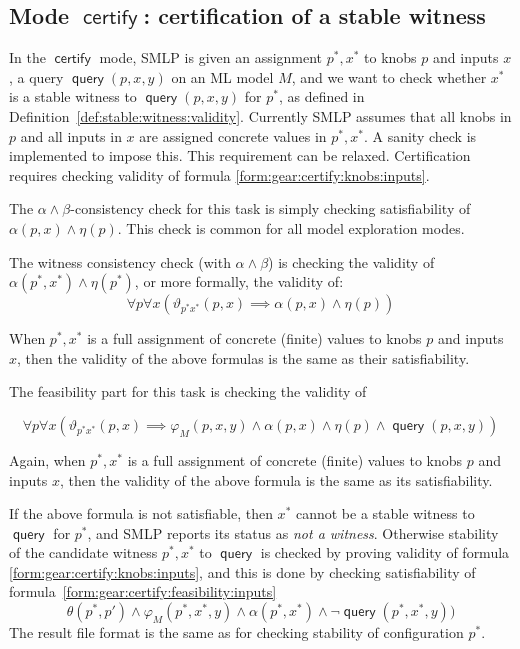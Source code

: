 \documentclass[a4paper,parskip=half]{article} %
\newcommand*\query{\operatorname{\mathsf{query}}}
\newcommand*\mode[1]{\operatorname{\mathsf{#1}}} %
\begin{document}
\subsection{Mode $\mode{certify}$: certification of a stable witness}\label{sect:certify}



In the $\mode{certify}$ mode, SMLP is given an assignment $p^*,x^*$ to knobs $p$ and inputs $x$, 
 a query $\query(p,x,y)$ on an ML model $M$, and we want to check whether $x^*$ is a stable witness to
 $\query(p,x,y)$ for $p^*$, as defined in Definition~\ref{def:stable:witness:validity}.
Currently SMLP assumes that all knobs in $p$ and all inputs in $x$ are assigned concrete values in $p^*, x^*$.
A sanity check is implemented to impose this. This requirement can be relaxed.
Certification requires checking validity of  formula \cref{form:gear:certify:knobs:inputs}. 


The $\alpha \wedge \beta$-consistency check for this task 
is simply checking satisfiability  of $\alpha(p, x) \wedge \eta(p)$. 
This check is common for all model exploration modes.

The witness consistency check (with  $\alpha \wedge \beta$) is checking the validity of 
$\alpha(p^*, x^*) \wedge \eta(p^*) $, or more formally, the validity of:
\begin{equation}\label{form:gear:certify:feasibility:inputs}
      \forall p \forall x ( \vartheta_{p^*x^*}(p,x) \implies   \alpha(p, x) \wedge \eta(p))
\end{equation}


When $p^*,x^*$ is a full assignment of concrete (finite) values to knobs $p$ and inputs $x$, then 
the validity of the above formulas is the same as their satisfiability.


The feasibility part for this task is checking  the validity of 

\begin{equation}\label{form:gear:certify:feasibility:inputs}
      \forall p \forall x ( \vartheta_{p^*x^*}(p,x) \implies  \varphi_M(p,x,y)  \wedge  \alpha(p, x) \wedge \eta(p)  \wedge   \query(p,x,y))
\end{equation}

Again, when $p^*,x^*$ is a full assignment of concrete (finite) values to knobs $p$ and inputs $x$, then 
the validity of the above formula is the same as its satisfiability.


If the above formula is not satisfiable, then $x^*$ cannot be a stable witness to $\query$ for $p^*$, 
and SMLP reports its status as \emph{not a witness}. 
Otherwise stability of the candidate witness $p^*, x^*$ to $\query$ is checked by proving validity of 
formula \cref{form:gear:certify:knobs:inputs},
and this is done by checking satisfiability of formula~\cref{form:gear:certify:feasibility:inputs}
\begin{equation}\label{form:gear:certify:feasibility:inputs} %
     \theta(p^*, p')  \wedge  \varphi_M(p^*,x^*,y)  \wedge  \alpha(p^*,x^*) \wedge   \neg \query(p^*,x^*,y))
\end{equation}
The result file format is the same as for checking stability of configuration $p^*$.
\end{document}
